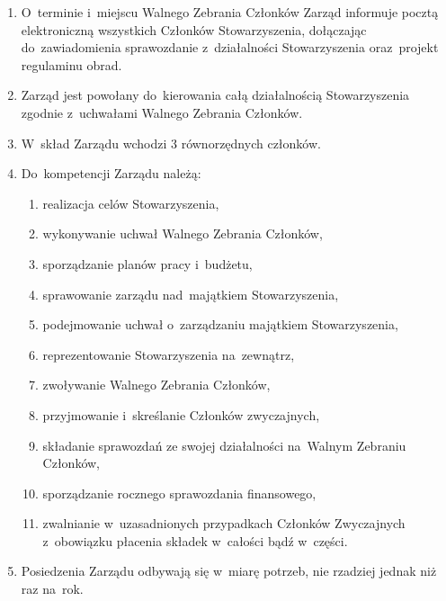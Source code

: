 \documentclass{article}
\begin{document}
\begin{enumerate}
\begin{enumerate}
        \item Aby Walne Zebranie Członków w~trybie nadzwyczajnym mogło się rozpocząć, w~pierwszym terminie wymagane jest kworum, czyli obecność co najmniej połowy ogólnej liczby zwyczajnych Członków Stowarzyszenia.
        \item W~drugim terminie kworum nie jest wymagane.
        \item Oba terminy Walnego Zebrania Członków w~trybie nadzwyczajnym muszą być odległe od~siebie przynajmniej 3, ale~nie bardziej niż 7 dni kalendarzowych.
      \end{enumerate}
    \item O~terminie i~miejscu Walnego Zebrania Członków Zarząd informuje pocztą elektroniczną wszystkich Członków Stowarzyszenia, dołączając do~zawiadomienia sprawozdanie z~działalności Stowarzyszenia oraz~projekt regulaminu obrad.
    \item Zarząd jest powołany do~kierowania całą działalnością Stowarzyszenia zgodnie z~uchwałami Walnego Zebrania Członków.
    \item W~skład Zarządu wchodzi 3 równorzędnych członków.
    \item Do~kompetencji Zarządu należą:
      \begin{enumerate}
        \item realizacja celów Stowarzyszenia,
        \item wykonywanie uchwał Walnego Zebrania Członków,
        \item sporządzanie planów pracy i~budżetu,
        \item sprawowanie zarządu nad~majątkiem Stowarzyszenia,
        \item podejmowanie uchwał o~zarządzaniu majątkiem Stowarzyszenia,
        \item reprezentowanie Stowarzyszenia na~zewnątrz,
        \item zwoływanie Walnego Zebrania Członków,
        \item przyjmowanie i~skreślanie Członków zwyczajnych,
        \item składanie sprawozdań ze swojej działalności na~Walnym Zebraniu Członków,
        \item sporządzanie rocznego sprawozdania finansowego,
        \item zwalnianie w~uzasadnionych przypadkach Członków Zwyczajnych z~obowiązku płacenia składek w~całości bądź w~części.
      \end{enumerate}
    \item Posiedzenia Zarządu odbywają się w~miarę potrzeb, nie rzadziej jednak niż raz na~rok.

\end{enumerate}
\end{document}
